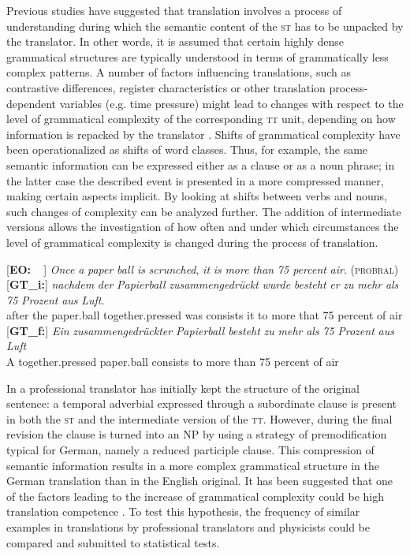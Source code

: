 \documentclass[output=paper]{LSP/langsci}
\begin{document}
Previous studies have suggested that translation involves a process of understanding during which the semantic content of the \textsc{st} has to be unpacked by the translator. In other words, it is assumed that certain highly dense grammatical structures are typically understood in terms of grammatically less complex patterns. A number of factors influencing translations, such as contrastive differences, register characteristics or other translation process-dependent variables (e.g. time pressure) might lead to changes with respect to the level of grammatical complexity of the corresponding \textsc{tt} unit, depending on how information is repacked by the translator \citep{Steiner2001,Hansen-Schirra2012}. Shifts of grammatical complexity have been operationalized as shifts of word classes. Thus, for example, the same semantic information can be expressed either as a clause or as a noun phrase; in the latter case the described event is presented in a more compressed manner, making certain aspects implicit. By looking at shifts between verbs and nouns, such changes of complexity can be analyzed further. The addition of intermediate versions allows the investigation of how often and under which circumstances the level of grammatical complexity is changed during the process of translation. 

\ea \label{ex:1:9}
\begin{xlist}
\exi{}[\textbf{EO:~~}]{ \emph{Once} \emph{a} \emph{paper} \emph{ball} \emph{is} \emph{scrunched}, \emph{it} \emph{is} \emph{more} \emph{than} \emph{75 percent} \emph{air}. (\textsc{probral})}
\exi{}[\textbf{GT\_i:}]{
\gll \emph{nachdem} \emph{der} \emph{Papierball} \emph{zusammengedrückt} \emph{wurde} \emph{besteht} \emph{er} \emph{zu} \emph{mehr} \emph{als} \emph{75} \emph{Prozent} \emph{aus} \emph{Luft}.\\
after the paper.ball together.pressed was consists it to more that 75 percent of air\\}
\exi{}[\textbf{GT\_f:}]{
\gll \emph{Ein} \emph{zusammengedrückter} \emph{Papierball} \emph{besteht} \emph{zu} \emph{mehr} \emph{als} \emph{75} \emph{Prozent} \emph{aus} \emph{Luft}\\
A together.pressed paper.ball consists to more than 75 percent of air\\
}
\end{xlist}
\z

In  a professional translator has initially kept the structure of the original sentence: a temporal adverbial expressed through a subordinate clause is present in both the \textsc{st} and the intermediate version of the \textsc{tt}. However, during the final revision the clause is turned into an NP by using a strategy of premodification typical for German, namely a reduced participle clause. This compression of semantic information results in a more complex grammatical structure in the German translation than in the English original. It has been suggested that one of the factors leading to the increase of grammatical complexity could be high translation competence \citep[260]{Hansen-Schirra2012}. To test this hypothesis, the frequency of similar examples in translations by professional translators and physicists could be compared and submitted to statistical tests. 
\end{document}
